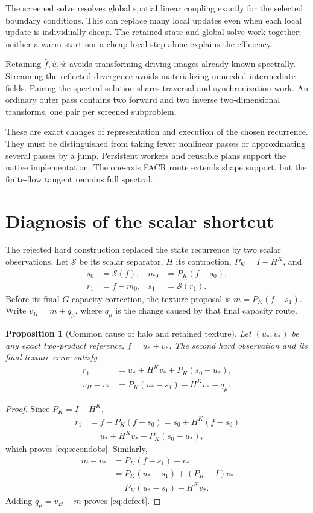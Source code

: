 \documentclass[10pt,twocolumn]{article}
\newtheorem{proposition}{Proposition}[section]
\theoremstyle{definition}\newtheorem{remark}[proposition]{Remark}
\begin{document}
The screened solve resolves global spatial linear coupling exactly for the
selected boundary conditions. This can replace many local updates even
when each local update is individually cheap. The retained state and
global solve work together; neither a warm start nor a cheap local step
alone explains the efficiency.

Retaining $\widehat f,\widehat u,\widehat w$ avoids transforming driving
images already known spectrally. Streaming the reflected divergence avoids
materializing unneeded intermediate fields. Pairing the spectral solution
shares traversal and synchronization work. An ordinary outer pass contains
two forward and two inverse two-dimensional transforms, one pair per
screened subproblem.

These are exact changes of representation and execution of the chosen
recurrence. They must be distinguished from taking fewer nonlinear passes
or approximating several passes by a jump. Persistent workers and reusable
plans support the native implementation. The one-axis FACR route extends
shape support, but the finite-flow tangent remains full spectral.
\section{Diagnosis of the scalar shortcut}

The rejected hard construction replaced the state recurrence by two scalar
observations.  Let $\mathcal S$ be its scalar separator, $H$ its contraction,
$P_K=I-H^K$, and
\begin{align}
s_0&=\mathcal S(f),&m_0&=P_K(f-s_0),\nonumber\\
r_1&=f-m_0,&s_1&=\mathcal S(r_1).
\end{align}
Before its final $G$-capacity correction, the texture proposal is
$m=P_K(f-s_1)$.  Write $v_H=m+q_\mu$, where $q_\mu$ is the change caused by
that final capacity route.

\begin{proposition}[Common cause of halo and retained texture]
Let $(u_*,v_*)$ be any exact two-product reference, $f=u_*+v_*$.  The second
hard observation and its final texture error satisfy
\begin{align}
r_1&=u_*+H^Kv_*+P_K(s_0-u_*),\label{eq:secondobs}\\
v_H-v_*&=P_K(u_*-s_1)-H^Kv_*+q_\mu .\label{eq:defect}
\end{align}
\end{proposition}
\begin{proof}
Since $P_K=I-H^K$,
\begin{align*}
r_1&=f-P_K(f-s_0)=s_0+H^K(f-s_0)\\
&=u_*+H^Kv_*+P_K(s_0-u_*),
\end{align*}
which proves \eqref{eq:secondobs}.  Similarly,
\begin{align*}
m-v_*&=P_K(f-s_1)-v_*\\
&=P_K(u_*-s_1)+(P_K-I)v_*\\
&=P_K(u_*-s_1)-H^Kv_*.
\end{align*}
Adding $q_\mu=v_H-m$ proves \eqref{eq:defect}.
\end{proof}
\end{document}
